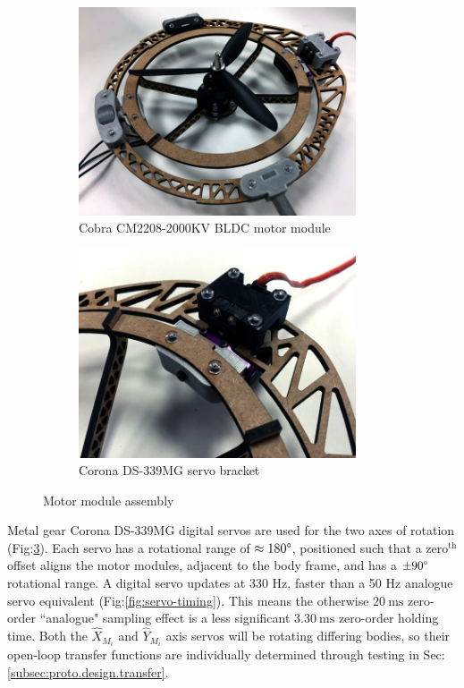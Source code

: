\begin{figure}[htbp]
\centering
\begin{subfigure}{0.49\textwidth}
\centering
\includegraphics[width=0.9\textwidth]{figs/motor-bldc}
\caption{Cobra CM2208-2000KV BLDC motor module}
\label{fig:bldc-motor}
\end{subfigure}
\begin{subfigure}{0.49\textwidth}
\centering
\includegraphics[width=0.9\textwidth]{figs/motor-servo}
\caption{Corona DS-339MG servo bracket}
\label{fig:motor-servo}
\end{subfigure}
\vspace{-5pt}
\caption{Motor module assembly}
\vspace{-15pt}
\end{figure}
\par
Metal gear Corona DS-339MG digital servos are used for the two axes of rotation (Fig:\ref{fig:motor-servo}). Each servo has a rotational range of $\approx 180\text{\textdegree}$, positioned such that a $\text{zero}^{\text{th}}$ offset aligns the motor modules, adjacent to the body frame, and has a $\pm 90\text{\textdegree}$ rotational range. A digital servo updates at 330 Hz, faster than a 50 Hz analogue servo equivalent (Fig:\ref{fig:servo-timing}). This means the otherwise $20~\text{ms}$ zero-order ``analogue" sampling effect is a less significant $3.30~\text{ms}$ zero-order holding time. Both the $\hat{X}_{M_i}$ and $\hat{Y}_{M_i}$ axis servos will be rotating differing bodies, so their open-loop transfer functions are individually determined through testing in Sec:\ref{subsec:proto.design.transfer}.
